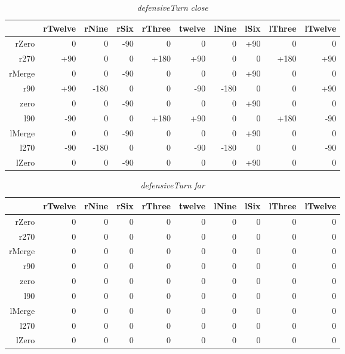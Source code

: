 \begin{table}[H]
\centering
\caption{\emph{defensiveTurn} \emph{close}}
\label{Turn rule table}
\begin{tabular}{r|r|r|r|r|r|r|r|r|r}
 		& rTwelve 	& rNine 	& rSix 		& rThree 		& twelve 	& lNine 	& lSix 		& lThree	& lTwelve		\\ \hline
rZero	& 0			& 0			& -90		& 0 		 	& 0			& 0			& +90	 	& 0			& 0				\\
r270	& +90		& 0			& 0			& +180			& +90		& 0			& 0			& +180		& +90			\\
rMerge	& 0			& 0			& -90	 	& 0				& 0			& 0			& +90		& 0			& 0				\\
r90		& +90		& -180		& 0 		& 0				& -90		& -180		& 0			& 0			& +90			\\
zero 	& 0			& 0 		& -90 		& 0				& 0			& 0			& +90		& 0			& 0				\\
l90 	& -90		& 0 		& 0			& +180			& +90		& 0			& 0			& +180		& -90			\\
lMerge	& 0			& 0 		& -90 		& 0				& 0			& 0			& +90		& 0			& 0				\\
l270 	& -90		& -180 		& 0			& 0				& -90		& -180		& 0			& 0			& -90			\\
lZero 	& 0			& 0 		& -90	 	& 0				& 0			& 0  		& +90		& 0			& 0				\\
\end{tabular}
\end{table}

\begin{table}[H]
\centering
\caption{\emph{defensiveTurn} \emph{far}}
\label{Turn rule table}
\begin{tabular}{r|r|r|r|r|r|r|r|r|r}
 		& rTwelve 	& rNine 	& rSix 		& rThree 	& twelve 	& lNine 	& lSix 		& lThree	& lTwelve	\\ \hline
rZero	& 0			& 0			& 0			& 0 	 	& 0			& 0			& 0	 		& 0			& 0			\\
r270	& 0			& 0			& 0			& 0			& 0			& 0			& 0			& 0			& 0			\\
rMerge	& 0			& 0			& 0	 		& 0			& 0			& 0			& 0			& 0			& 0			\\
r90		& 0			& 0			& 0 		& 0			& 0			& 0			& 0			& 0			& 0			\\
zero 	& 0			& 0 		& 0	 		& 0			& 0			& 0			& 0			& 0			& 0			\\
l90 	& 0			& 0 		& 0			& 0			& 0			& 0			& 0			& 0			& 0			\\
lMerge	& 0			& 0 		& 0	 		& 0			& 0			& 0			& 0			& 0			& 0			\\
l270 	& 0			& 0	 		& 0 		& 0			& 0			& 0			& 0			& 0			& 0			\\
lZero 	& 0			& 0 		& 0	 		& 0			& 0			& 0  		& 0			& 0			& 0			\\
\end{tabular}
\end{table}

